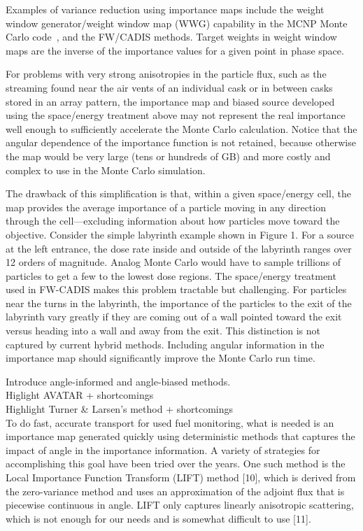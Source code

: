\documentclass[12pt]{article}
\begin{document}
Examples of variance reduction using importance maps include the weight window generator/weight window map (WWG) capability in the MCNP Monte Carlo code~\cite{brown_mcnp_2002}, and the FW/CADIS methods. Target weights in weight window maps are the inverse of the importance values for a given point in phase space.

For problems with very strong anisotropies in the particle flux, such as the streaming found near the air vents of an individual cask or in between casks stored in an array pattern, the importance map and biased source developed using the space/energy treatment above may not represent the real importance well enough to sufficiently accelerate the Monte Carlo calculation. Notice that the angular dependence of the importance function is not retained, because otherwise the map would be very large (tens or hundreds of GB) and more costly and complex to use in the Monte Carlo simulation. 

The drawback of this simplification is that, within a given space/energy cell, the map provides the average importance of a particle moving in any direction through the cell—excluding information about how particles move toward the objective. Consider the simple labyrinth example shown in Figure 1. For a source at the left entrance, the dose rate inside and outside of the labyrinth ranges over 12 orders of magnitude. Analog Monte Carlo would have to sample trillions of particles to get a few to the lowest dose regions. The space/energy treatment used in FW-CADIS makes this problem tractable but challenging. For particles near the turns in the labyrinth, the importance of the particles to the exit of the labyrinth vary greatly if they are coming out of a wall pointed toward the exit versus heading into a wall and away from the exit. This distinction is not captured by current hybrid methods. Including angular information in the importance map should significantly improve the Monte Carlo run time. 

Introduce angle-informed and angle-biased methods. \\
Higlight AVATAR + shortcomings \\
Highlight Turner \& Larsen's method + shortcomings\\

To do fast, accurate transport for used fuel monitoring, what is needed is an importance map generated quickly using deterministic methods that captures the impact of angle in the importance information. A variety of strategies for accomplishing this goal have been tried over the years. One such method is the Local Importance Function Transform (LIFT) method [10], which is derived from the zero-variance method and  uses an approximation of the adjoint flux that is piecewise continuous in angle. LIFT only captures linearly anisotropic scattering, which is not enough for our needs and is somewhat difficult to use [11].
\end{document}
